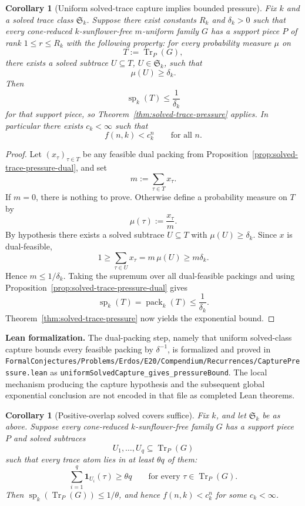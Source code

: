 \documentclass[11pt]{article}
\newtheorem{corollary}[theorem]{Corollary}
\theoremstyle{definition}
\newcommand{\Tr}{\operatorname{Tr}}
\newcommand{\1}{\mathbf{1}}
\newcommand{\leannote}[1]{\par\smallskip\noindent\textbf{Lean formalization.} #1\par\smallskip}
\begin{document}
\begin{corollary}[Uniform solved-trace capture implies bounded pressure]\label{cor:solved-trace-capture}
Fix $k$ and a solved trace class $\mathfrak S_k$. Suppose there exist constants $R_k$ and $\delta_k>0$ such that every cone-reduced $k$-sunflower-free $m$-uniform family $G$ has a support piece $P$ of rank $1\le r\le R_k$ with the following property: for every probability measure $\mu$ on
\[
T:=\Tr_P(G),
\]
there exists a solved subtrace $U\subseteq T$, $U\in \mathfrak S_k$, such that
\[
\mu(U)\ge \delta_k.
\]
Then
\[
\operatorname{sp}_k(T)\le \frac{1}{\delta_k}
\]
for that support piece, so Theorem~\ref{thm:solved-trace-pressure} applies. In particular there exists $c_k<\infty$ such that
\[
f(n,k)<c_k^n
\qquad\text{for all }n.
\]
\end{corollary}

\begin{proof}
Let $(x_\tau)_{\tau\in T}$ be any feasible dual packing from Proposition~\ref{prop:solved-trace-pressure-dual}, and set
\[
m:=\sum_{\tau\in T} x_\tau.
\]
If $m=0$, there is nothing to prove. Otherwise define a probability measure on $T$ by
\[
\mu(\tau):=\frac{x_\tau}{m}.
\]
By hypothesis there exists a solved subtrace $U\subseteq T$ with $\mu(U)\ge \delta_k$. Since $x$ is dual-feasible,
\[
1\ge \sum_{\tau\in U} x_\tau = m\,\mu(U)\ge m\delta_k.
\]
Hence $m\le 1/\delta_k$. Taking the supremum over all dual-feasible packings and using Proposition~\ref{prop:solved-trace-pressure-dual} gives
\[
\operatorname{sp}_k(T)=\operatorname{pack}_k(T)\le \frac{1}{\delta_k}.
\]
Theorem~\ref{thm:solved-trace-pressure} now yields the exponential bound.
\end{proof}

\leannote{The dual-packing step, namely that uniform solved-class capture bounds every feasible packing by \(\delta^{-1}\), is formalized and proved in \texttt{FormalConjectures/Problems/Erdos/E20/Compendium/Recurrences/CapturePressure.lean} as \texttt{uniformSolvedCapture\_gives\_pressureBound}. The local mechanism producing the capture hypothesis and the subsequent global exponential conclusion are not encoded in that file as completed Lean theorems.}

\begin{corollary}[Positive-overlap solved covers suffice]\label{cor:solved-trace-positive-overlap}
Fix $k$, and let $\mathfrak S_k$ be as above. Suppose every cone-reduced $k$-sunflower-free family $G$ has a support piece $P$ and solved subtraces
\[
U_1,\dots,U_q\subseteq \Tr_P(G)
\]
such that every trace atom lies in at least $\theta q$ of them:
\[
\sum_{i=1}^q \mathbf 1_{U_i}(\tau)\ge \theta q
\qquad\text{for every }\tau\in \Tr_P(G).
\]
Then $\operatorname{sp}_k(\Tr_P(G))\le 1/\theta$, and hence $f(n,k)<c_k^n$ for some $c_k<\infty$.
\end{corollary}
\end{document}
